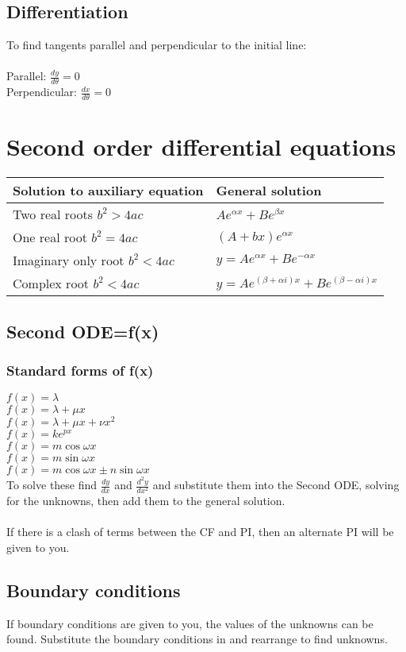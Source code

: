 \documentclass{article}[18pt]
\begin{document}
\subsection{Differentiation}
To find tangents parallel and perpendicular to the initial line:\\
\\
Parallel: $\frac{dy}{d\theta}=0$\\
Perpendicular: $\frac{dx}{d\theta}=0$
\section{Second order differential equations}
{\renewcommand{\arraystretch}{2}
\begin{tabularx}{\textwidth}{|X|X|}
\hline
\textbf{Solution to auxiliary equation}&\textbf{General solution}\\
\hline
Two real roots $b^2>4ac$&$Ae^{\alpha x}+Be^{\beta x}$\\
\hline
One real root $b^2=4ac$&$(A+bx)e^{\alpha x}$\\
\hline
Imaginary only root $b^2<4ac$&$y=Ae^{\alpha x}+Be^{-\alpha x}$\\
\hline
Complex root $b^2<4ac$&$y=Ae^{(\beta+\alpha i)x}+Be^{(\beta-\alpha i)x}$\\
\hline
\end{tabularx}}
\subsection{Second ODE=f(x)}
\subsubsection{Standard forms of f(x)}
$f(x)=\lambda$\\
$f(x)=\lambda+\mu x$\\
$f(x)=\lambda+\mu x+\nu x^2$\\
$f(x)=ke^{px}$\\
$f(x)=m\cos\omega x$\\
$f(x)=m\sin\omega x$\\
$f(x)=m\cos\omega x\pm n\sin\omega x$
\\
To solve these find $\frac{dy}{dx}$ and $\frac{d^2y}{dx^2}$ and substitute them into the Second ODE, solving for the unknowns, then add them to the general solution.\\
\\
If there is a clash of terms between the CF and PI, then an alternate PI will be given to you.
\subsection{Boundary conditions}
If boundary conditions are given to you, the values of the unknowns can be found. Substitute the boundary conditions in and rearrange to find unknowns.
\newpage
\end{document}
